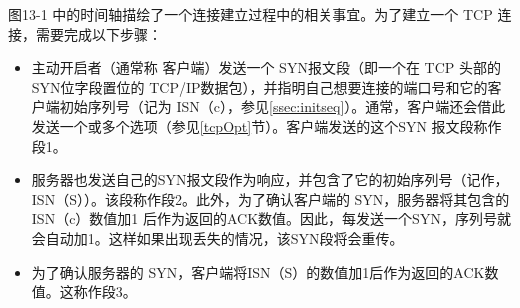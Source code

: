 图13-1 中的时间轴描绘了一个连接建立过程中的相关事宜。为了建立一个 TCP 连接，需要完成以下步骤：
\begin{itemize}
	\item 主动开启者（通常称 客户端）发送一个 SYN报文段（即一个在 TCP 头部的SYN位字段置位的 TCP/IP数据包），并指明自己想要连接的端口号和它的客户端初始序列号（记为
	      ISN（c），参见\ref{ssec:initseq}）。通常，客户端还会借此发送一个或多个选项（参见\ref{tcpOpt}节）。客户端发送的这个SYN 报文段称作段1。
	\item 服务器也发送自己的SYN报文段作为响应，并包含了它的初始序列号（记作，ISN（S））。该段称作段2。此外，为了确认客户端的 SYN，服务器将其包含的ISN（c）数值加1
	      后作为返回的ACK数值。因此，每发送一个SYN，序列号就会自动加1。这样如果出现丢失的情况，该SYN段将会重传。
	\item 为了确认服务器的 SYN，客户端将ISN（S）的数值加1后作为返回的ACK数值。这称作段3。
\end{itemize}
